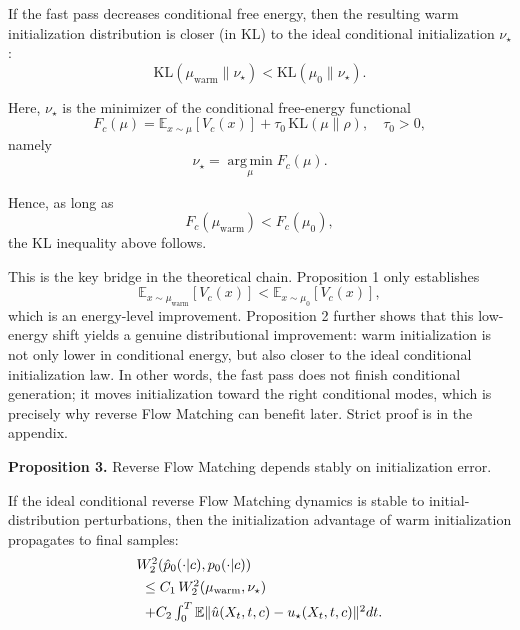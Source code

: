 \documentclass[letterpaper]{article} %
\begin{document}
If the fast pass decreases conditional free energy, then the resulting warm initialization distribution is closer (in KL) to the ideal conditional initialization $\nu_\star$:
\begin{equation}
\mathrm{KL}(\mu_{\mathrm{warm}}\|\nu_\star)<\mathrm{KL}(\mu_0\|\nu_\star).
\end{equation}

Here, $\nu_\star$ is the minimizer of the conditional free-energy functional
\begin{equation}
F_c(\mu)=\mathbb E_{x\sim\mu}[V_c(x)]+\tau_0\,\mathrm{KL}(\mu\|\rho),\quad \tau_0>0,
\end{equation}
namely
\begin{equation}
\nu_\star=\mathop{\mathrm{arg\,min}}\limits_{\mu}F_c(\mu).
\end{equation}

Hence, as long as
\begin{equation}
F_c(\mu_{\mathrm{warm}})<F_c(\mu_0),
\end{equation}
the KL inequality above follows.

This is the key bridge in the theoretical chain. Proposition 1 only establishes
\begin{equation}
\mathbb E_{x\sim\mu_{\mathrm{warm}}}[V_c(x)]<\mathbb E_{x\sim\mu_0}[V_c(x)],
\end{equation}
which is an energy-level improvement. Proposition 2 further shows that this low-energy shift yields a genuine distributional improvement: warm initialization is not only lower in conditional energy, but also closer to the ideal conditional initialization law. In other words, the fast pass does not finish conditional generation; it moves initialization toward the right conditional modes, which is precisely why reverse Flow Matching can benefit later. Strict proof is in the appendix.

\textbf{Proposition 3.} Reverse Flow Matching depends stably on initialization error.

If the ideal conditional reverse Flow Matching dynamics is stable to initial-distribution perturbations, then the initialization advantage of warm initialization propagates to final samples:
\begin{equation}
\begin{array}{l}
W_2^2\!\left(\hat p_0(\cdot|c),p_0(\cdot|c)\right) \\[4pt]
\hspace*{0.6em}\le C_1\,W_2^2(\mu_{\mathrm{warm}},\nu_\star) \\[4pt]
\hspace*{0.6em}+ C_2\int_0^T\mathbb E\|\hat u(X_t,t,c)-u_\star(X_t,t,c)\|^2dt.
\end{array}
\end{equation}
\end{document}
